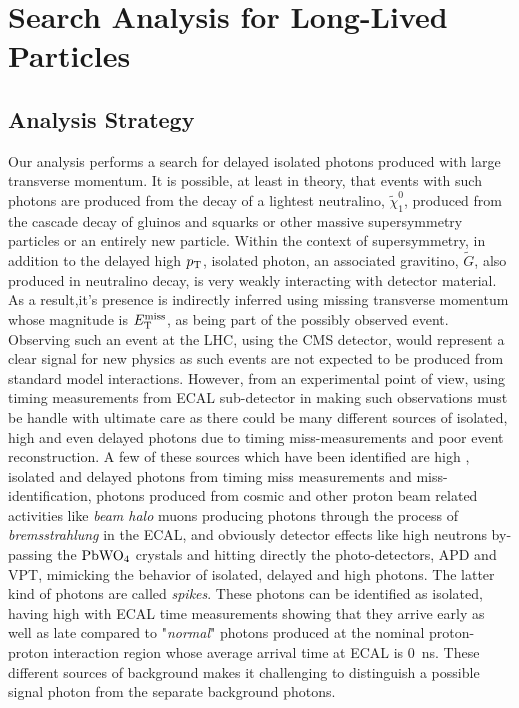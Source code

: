 \chapter{Search Analysis for Long-Lived Particles }
\section{Analysis Strategy}
Our analysis performs a search for delayed isolated photons produced with large transverse momentum.
It is possible, at least in theory, that events with such photons are produced from the decay of a lightest neutralino, $\tilde{\chi}^{0}_{1}$, produced from the cascade decay of gluinos and squarks or other massive supersymmetry particles or an entirely new particle. Within the context of supersymmetry, in addition to the delayed high $p_{\mathrm{T}}$, isolated photon, an associated gravitino, $\tilde{G}$, also produced in neutralino decay, is very weakly interacting with detector material. As a result,it's presence is indirectly inferred using missing transverse momentum whose magnitude is $E_{\mathrm{T}}^{\text{miss}}$, as being part of the possibly observed event. 
Observing such an event at the LHC, using the CMS detector, would represent a clear signal for new physics as such events are not expected to be produced from standard model interactions.
 However, from an experimental point of view, using  timing measurements from  ECAL sub-detector in making such observations must be handle with ultimate care as there could be many different sources of isolated, high \pt and even delayed photons due to timing miss-measurements  and poor event reconstruction.  A few of these sources which have been identified are high \pt, isolated and delayed photons from timing miss measurements and miss-identification, photons produced from cosmic and other proton beam related activities like \textit{beam halo} muons  producing photons through the process of \textit{bremsstrahlung} in the ECAL, and obviously detector effects like high \pt neutrons by-passing the $\text{PbWO}_{4}$ crystals and hitting directly the photo-detectors, APD and VPT, mimicking the behavior of isolated, delayed and high \pt photons. The latter kind of photons are called \textit{spikes}. These photons can be identified as isolated, having high \pt with  ECAL time measurements showing that they arrive early as well as late compared to "\textit{normal}" photons produced at the nominal proton-proton interaction region whose average arrival time at ECAL is 0~ns. These different sources of background makes it challenging to distinguish a possible signal photon from the separate background photons.
